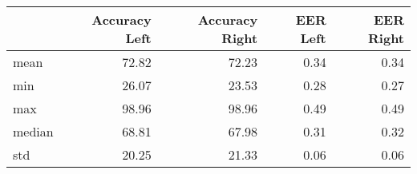 \begin{tabular}{lrrrr}
\toprule
{} &  Accuracy Left &  Accuracy Right &  EER Left &  EER Right \\
\midrule
mean   &          72.82 &           72.23 &      0.34 &       0.34 \\
min    &          26.07 &           23.53 &      0.28 &       0.27 \\
max    &          98.96 &           98.96 &      0.49 &       0.49 \\
median &          68.81 &           67.98 &      0.31 &       0.32 \\
std    &          20.25 &           21.33 &      0.06 &       0.06 \\
\bottomrule
\end{tabular}

